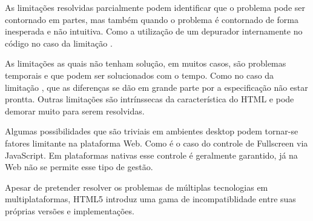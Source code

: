 As limitações resolvidas parcialmente podem identificar que o
problema pode ser contornado em partes, mas também quando o problema
é contornado de forma inesperada e não intuitiva. Como a utilização
de um depurador internamente no código no caso da limitação
.

As limitações as quais não tenham solução, em muitos casos, são
problemas temporais e que podem ser solucionados com o tempo. Como no
caso da limitação , que as diferenças
se dão em grande parte por a especificação não estar prontta. Outras
limitações são intrínssecas da característica do HTML e pode
demorar muito para serem resolvidas.

Algumas possibilidades que são triviais em ambientes desktop podem
tornar-se fatores limitante na plataforma Web. Como é o caso do
controle de Fullscreen via JavaScript. Em plataformas nativas esse
controle é geralmente garantido, já na Web não se permite esse
tipo de gestão. %

Apesar de pretender resolver os problemas de múltiplas tecnologias em
multiplataformas, HTML5 introduz uma gama de incompatiblidade entre suas
próprias versões e implementações.

